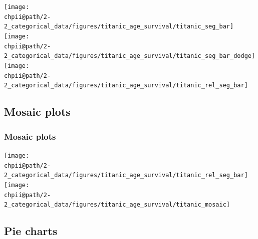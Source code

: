 \documentclass[slidestop,compress,mathserif]{beamer}
\makeatletter
\def\chpii@path{../../Chp 2}
\makeatother
\begin{document}

\begin{frame}


\begin{center}
\texttt{[image: \\chpii@path/2-2\_categorical\_data/figures/titanic\_age\_survival/titanic\_seg\_bar]}
\texttt{[image: \\chpii@path/2-2\_categorical\_data/figures/titanic\_age\_survival/titanic\_seg\_bar\_dodge]} \\
\texttt{[image: \\chpii@path/2-2\_categorical\_data/figures/titanic\_age\_survival/titanic\_rel\_seg\_bar]}
\end{center}

\end{frame}


\subsection{Mosaic plots}


\begin{frame}
\frametitle{Mosaic plots}


\begin{center}
\texttt{[image: \\chpii@path/2-2\_categorical\_data/figures/titanic\_age\_survival/titanic\_rel\_seg\_bar]}
\texttt{[image: \\chpii@path/2-2\_categorical\_data/figures/titanic\_age\_survival/titanic\_mosaic]}
\end{center}

\end{frame}


\subsection{Pie charts}

\end{document}
